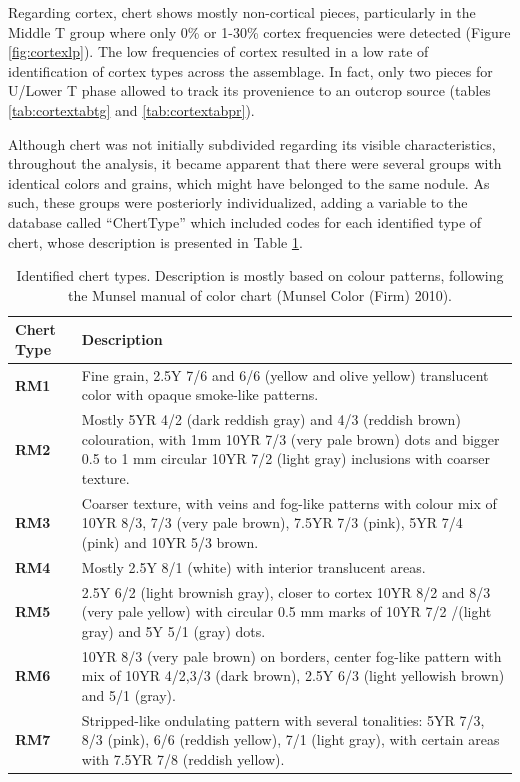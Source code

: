 \documentclass[12pt,twoside]{reedthesis}
\begin{document}
Regarding cortex, chert shows mostly non-cortical pieces, particularly in the Middle T group where only 0\% or 1-30\% cortex frequencies were detected (Figure \ref{fig:cortexlp}). The low frequencies of cortex resulted in a low rate of identification of cortex types across the assemblage. In fact, only two pieces for U/Lower T phase allowed to track its provenience to an outcrop source (tables \ref{tab:cortextabtg} and \ref{tab:cortextabpr}).

Although chert was not initially subdivided regarding its visible characteristics, throughout the analysis, it became apparent that there were several groups with identical colors and grains, which might have belonged to the same nodule. As such, these groups were posteriorly individualized, adding a variable to the database called ``ChertType'' which included codes for each identified type of chert, whose description is presented in Table \ref{tab:cherttable}.
\begin{table}

\caption{\label{tab:cherttable}Identified chert types. Description is mostly based on colour patterns, following the Munsel manual of color chart (Munsel Color (Firm) 2010).}
\centering
\begin{tabular}[t]{>{\bfseries}l>{\raggedright\arraybackslash}p{10cm}}
\toprule
Chert Type & Description\\
\midrule
RM1 & Fine grain, 2.5Y 7/6 and 6/6 (yellow and olive yellow) translucent color with opaque smoke-like patterns.\\
RM2 & Mostly 5YR 4/2 (dark reddish gray) and 4/3 (reddish brown) colouration, with 1mm 10YR 7/3 (very pale brown) dots and bigger 0.5 to 1 mm circular 10YR 7/2 (light gray) inclusions with coarser texture.\\
RM3 & Coarser texture, with veins and fog-like patterns with colour mix of 10YR 8/3, 7/3 (very pale brown), 7.5YR 7/3 (pink), 5YR 7/4 (pink) and 10YR 5/3 brown.\\
RM4 & Mostly 2.5Y 8/1 (white) with interior translucent areas.\\
RM5 & 2.5Y 6/2 (light brownish gray), closer to cortex 10YR 8/2 and 8/3 (very pale yellow) with circular 0.5 mm marks of 10YR 7/2 /(light gray) and 5Y 5/1 (gray) dots.\\
\addlinespace
RM6 & 10YR 8/3 (very pale brown) on borders, center fog-like pattern with mix of 10YR 4/2,3/3 (dark brown), 2.5Y 6/3 (light yellowish brown) and 5/1 (gray).\\
RM7 & Stripped-like ondulating pattern with several tonalities: 5YR 7/3, 8/3 (pink), 6/6 (reddish yellow), 7/1 (light gray), with certain areas with 7.5YR 7/8 (reddish yellow).\\
\bottomrule
\end{tabular}
\end{table}
\end{document}
